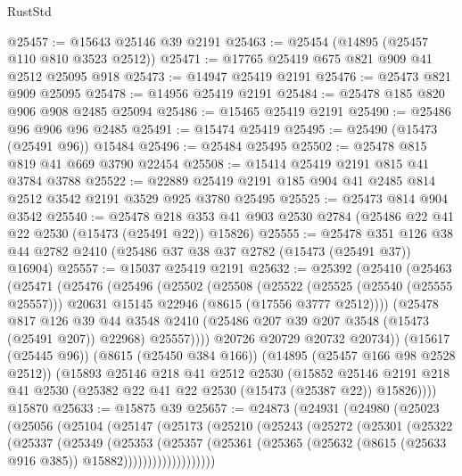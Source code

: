 \begin{lexlean}{RustStd}
\begin{coremodule}
@25457 := @15643 @25146 @39 @2191
@25463 := @25454 (@14895 (@25457 @110 @810 @3523 @2512))
@25471 := @17765 @25419 @675 @821 @909 @41 @2512 @25095 @918
@25473 := @14947 @25419 @2191
@25476 := @25473 @821 @909 @25095
@25478 := @14956 @25419 @2191
@25484 := @25478 @185 @820 @906 @908 @2485 @25094
@25486 := @15465 @25419 @2191
@25490 := @25486 @96 @906 @96 @2485
@25491 := @15474 @25419
@25495 := @25490 (@15473 (@25491 @96)) @15484
@25496 := @25484 @25495
@25502 := @25478 @815 @819 @41 @669 @3790 @22454
@25508 := @15414 @25419 @2191 @815 @41 @3784 @3788
@25522 := @22889 @25419 @2191 @185 @904 @41 @2485 @814 @2512 @3542 @2191 @3529 @925 @3780 @25495
@25525 := @25473 @814 @904 @3542
@25540 := @25478
    @218
    @353
    @41
    @903
    @2530
    @2784
    (@25486 @22 @41 @22 @2530 (@15473 (@25491 @22)) @15826)
@25555 := @25478
    @351
    @126
    @38
    @44
    @2782
    @2410
    (@25486 @37 @38 @37 @2782 (@15473 (@25491 @37)) @16904)
@25557 := @15037 @25419 @2191
@25632 := @25392
    (@25410
      (@25463
        (@25471
          (@25476
            (@25496
              (@25502
                (@25508
                  (@25522
                    (@25525 (@25540 (@25555 @25557)))
                    @20631
                    @15145
                    @22946
                    (@8615 (@17556 @3777 @2512))))
                (@25478
                  @817
                  @126
                  @39
                  @44
                  @3548
                  @2410
                  (@25486 @207 @39 @207 @3548 (@15473 (@25491 @207)) @22968)
                  @25557))))
          @20726
          @20729
          @20732
          @20734))
      (@15617 (@25445 @96))
      (@8615 (@25450 @384 @166))
      (@14895 (@25457 @166 @98 @2528 @2512))
      (@15893
        @25146
        @218
        @41
        @2512
        @2530
        (@15852
          @25146
          @2191
          @218
          @41
          @2530
          (@25382 @22 @41 @22 @2530 (@15473 (@25387 @22)) @15826))))
    @15870
@25633 := @15875 @39
@25657 := @24873
    (@24931
      (@24980
        (@25023
          (@25056
            (@25104
              (@25147
                (@25173
                  (@25210
                    (@25243
                      (@25272
                        (@25301
                          (@25322
                            (@25337
                              (@25349
                                (@25353
                                  (@25357
                                    (@25361
                                      (@25365
                                        (@25632 (@8615 (@25633 @916 @385)) @15882)))))))))))))))))))

\end{coremodule}
\end{lexlean}
